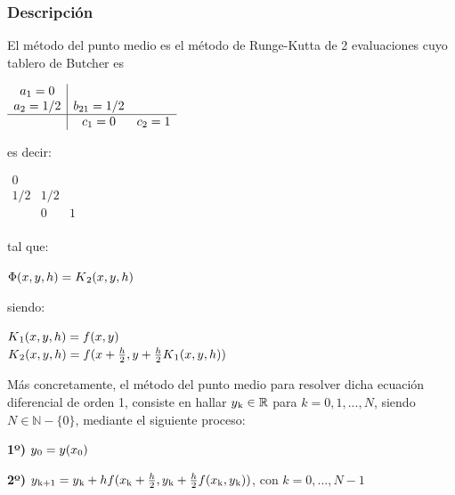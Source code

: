 \documentclass[paper=a4, fontsize=11pt]{scrartcl} %
\numberwithin{equation}{section}
\begin{document}
	\subsubsection{Descripción}
	El método del punto medio es el método de Runge-Kutta de 2 evaluaciones cuyo tablero de Butcher es
	\begin{center}
		$\begin{array}{c|ccc}
		{a\textsubscript{1} = 0}\\
		{a\textsubscript{2} = 1/2}&{b\textsubscript{21} = 1/2}\\
		\hline
		{}&{c\textsubscript{1} = 0}&{c\textsubscript{2} = 1}\\
		\end{array}$
	\end{center}
	es decir:
	\begin{center}
		$\begin{array}{c|ccc}
		{0}\\
		{1/2}&{1/2}\\
		\hline
		{}&{0}&{1}\\
		\end{array}$
	\end{center}
	tal que:
	\begin{center}
		
		$\Phi(x,y,h) = K\textsubscript{2}(x,y,h)$
		
	\end{center}
	
	siendo:\\
	\begin{center}
		
		$K\textsubscript{1}(x,y,h) = f(x,y)$\\
		
		\setlength{\parskip}{10pt}$K\textsubscript{2}(x,y,h) = f(x + \frac{h}{2},y + \frac{h}{2}K\textsubscript{1}(x,y,h))$
		
	\end{center}
	Más concretamente, el método del punto medio para resolver dicha ecuación diferencial de orden 1, consiste en hallar $y\textsubscript{k} \in \mathbb{R}$ para $k = 0,1,...,N$, siendo $N \in \mathbb{N}-\lbrace0\rbrace$, mediante el siguiente proceso:
	
	\begin{center}
		\textbf{1º)} $y\textsubscript{0} = y(x\textsubscript{0})$
		
		\setlength{\parskip}{10pt}\textbf{2º)} $y\textsubscript{k+1} = y\textsubscript{k} + hf(x\textsubscript{k} + \frac{h}{2}, y\textsubscript{k} + \frac{h}{2}f(x\textsubscript{k}, y\textsubscript{k}))$, con $k = 0, ..., N-1$
	\end{center}
	
\end{document}
